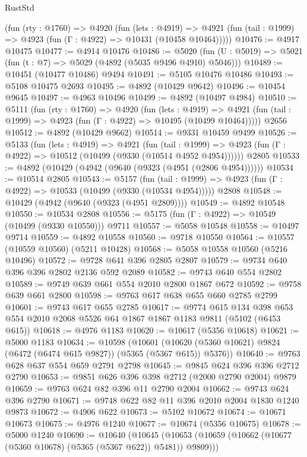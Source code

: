 \begin{lexlean}{RustStd}
\begin{coremodule}
    (fun (rty : @1760) =>
    @4920
      (fun (lets : @4919) =>
      @4921 (fun (tail : @1999) => @4923 (fun (Γ : @4922) => @10431 (@10458 @10464)))))
@10476 := @4917 @10475
@10477 := @4914 @10476
@10486 := @5020 (fun (U : @5019) => @5021 (fun (t : @7) => @5029 (@4892 (@5035 @9496 @4910) @5046)))
@10489 := @10451 (@10477 @10486) @9494
@10491 := @5105 @10476 @10486
@10493 := @5108 @10475 @2693
@10495 := @4892 (@10429 @9642)
@10496 := @10454 @9645
@10497 := @4963 @10496
@10499 := @4892 (@10497 @4984)
@10510 := @5111
    (fun (rty : @1760) =>
    @4920
      (fun (lets : @4919) =>
      @4921 (fun (tail : @1999) => @4923 (fun (Γ : @4922) => @10495 (@10499 @10464)))))
    @2656
@10512 := @4892 (@10429 @9662)
@10514 := @9331 @10459 @9499
@10526 := @5133
    (fun (lets : @4919) =>
    @4921
      (fun (tail : @1999) =>
      @4923 (fun (Γ : @4922) => @10512 (@10499 (@9330 (@10514 @4952 @4954))))))
    @2805
@10533 := @4892 (@10429 (@4942 (@9640 (@9323 (@4951 (@2806 @4954))))))
@10534 := @10514 @2805
@10543 := @5157
    (fun (tail : @1999) => @4923 (fun (Γ : @4922) => @10533 (@10499 (@9330 (@10534 @4954)))))
    @2808
@10548 := @10429 (@4942 (@9640 (@9323 (@4951 @2809))))
@10549 := @4892 @10548
@10550 := @10534 @2808
@10556 := @5175 (fun (Γ : @4922) => @10549 (@10499 (@9330 @10550))) @9711
@10557 := @5058 @10548
@10558 := @10497 @9714
@10559 := @4892 @10558
@10560 := @9718 @10550
@10564 := @10557 (@10559 @10560) (@5211 @10428)
@10568 := @5058 @10558 @10560 (@5216 @10496)
@10572 := @9728 @641 @396 @2805 @2807
@10579 := @9734 @640 @396 @396 @2802 @2136 @592 @2089
@10582 := @9743 @640 @554 @2802
@10589 := @9749 @639 @661 @554 @2010 @2800 @1867 @672
@10592 := @9758 @639 @661 @2800
@10598 := @9763 @617 @638 @655 @660 @2785 @2799
@10601 := @9743 @617 @655 @2785
@10617 := @9774
    @615
    @134
    @398
    @653
    @554
    @2010
    @2068
    @5526
    @64
    @1867
    @1867
    @1183
    @9811
    (@5102 (@6453 @615))
@10618 := @4976 @1183
@10620 := @10617 (@5356 @10618)
@10621 := @5000 @1183
@10634 := @10598
    (@10601 (@10620 (@5360 @10621) @9824 (@6472 (@6474 @615 @9827)) (@5365 (@5367 @615)) @5376))
@10640 := @9763 @628 @637 @554 @659 @2791 @2798
@10645 := @9845 @624 @396 @396 @2712 @2790
@10653 := @9851 @626 @396 @398 @2712 (@2000 @2790 @2004) @9879
@10659 := @9763 @624 @82 @396 @11 @2790 @2004
@10662 := @9743 @624 @396 @2790
@10671 := @9748 @622 @82 @11 @396 @2010 @2004 @1830 @1240 @9873
@10672 := @4906 @622
@10673 := @5102 @10672
@10674 := @10671 @10673
@10675 := @4976 @1240
@10677 := @10674 (@5356 @10675)
@10678 := @5000 @1240
@10690 := @10640
    (@10645 (@10653 (@10659 (@10662 (@10677 (@5360 @10678) (@5365 (@5367 @622)) @5481)) @9809)))

\end{coremodule}
\end{lexlean}
